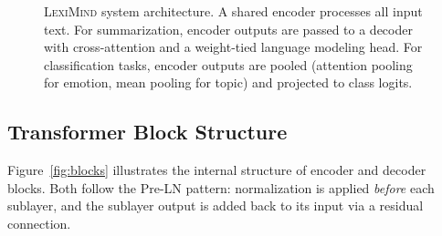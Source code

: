 \documentclass[11pt,a4paper]{article}
\newcommand{\lexiname}{\textsc{LexiMind}}
\begin{document}
\begin{figure}[t]
\caption{\lexiname{} system architecture. A shared encoder processes all input text. For summarization, encoder outputs are passed to a decoder with cross-attention and a weight-tied language modeling head. For classification tasks, encoder outputs are pooled (attention pooling for emotion, mean pooling for topic) and projected to class logits.}
\label{fig:architecture}
\end{figure}

\subsection{Transformer Block Structure}
\label{sec:blocks}

Figure~\ref{fig:blocks} illustrates the internal structure of encoder and decoder blocks.
Both follow the Pre-LN pattern: normalization is applied \emph{before} each sublayer, and the sublayer output is added back to its input via a residual connection.
\end{document}
